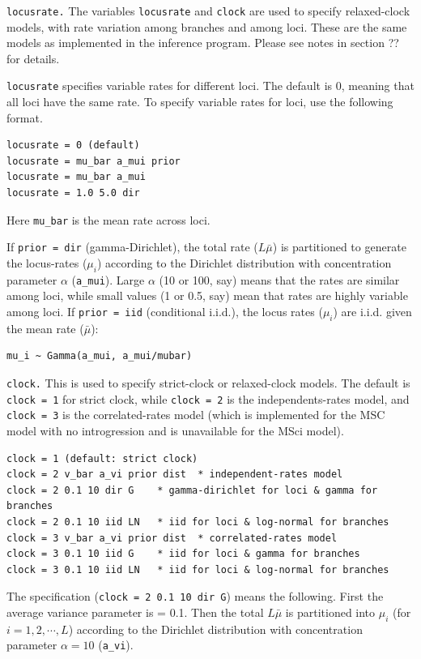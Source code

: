 \documentclass[a4paper]{book}
\numberwithin{equation}{section} \renewcommand{\baselinestretch}{0.55}
\begin{document}
\texttt{locusrate.}  The variables \texttt{locusrate} and
\texttt{clock} are used to specify relaxed-clock models, with rate
variation among branches and among loci.  These are the same models as
implemented in the inference program.  Please see notes in section ??
for details.

\texttt{locusrate} specifies variable rates for different loci.  The
default is 0, meaning that all loci have the same rate.  To specify
variable rates for loci, use the following format.
\begin{verbatim}
locusrate = 0 (default)
locusrate = mu_bar a_mui prior
locusrate = mu_bar a_mui
locusrate = 1.0 5.0 dir
\end{verbatim}
Here \texttt{mu\_bar} is the mean rate across loci.

If \texttt{prior = dir} (gamma-Dirichlet), the total rate ($L\bar\mu$)
is partitioned to generate the locus-rates ($\mu_i$) according to the
Dirichlet distribution with concentration parameter $\alpha$
(\texttt{a\_mui}).  Large $\alpha$ (10 or 100, say) means that the
rates are similar among loci, while small values (1 or 0.5, say) mean
that rates are highly variable among loci. If \texttt{prior = iid}
(conditional i.i.d.), the locus rates ($\mu_i$) are i.i.d. given the
mean rate ($\bar\mu$):
\begin{verbatim}
mu_i ~ Gamma(a_mui, a_mui/mubar)
\end{verbatim}

\texttt{clock.}  This is used to specify strict-clock or relaxed-clock
models.  The default is \texttt{clock = 1} for strict clock, while
\texttt{clock = 2} is the independents-rates model, and \texttt{clock
  = 3} is the correlated-rates model (which is implemented for the MSC
model with no introgression and is unavailable for the MSci model).
\begin{verbatim}
clock = 1 (default: strict clock)
clock = 2 v_bar a_vi prior dist  * independent-rates model
clock = 2 0.1 10 dir G    * gamma-dirichlet for loci & gamma for branches
clock = 2 0.1 10 iid LN   * iid for loci & log-normal for branches
clock = 3 v_bar a_vi prior dist  * correlated-rates model
clock = 3 0.1 10 iid G    * iid for loci & gamma for branches
clock = 3 0.1 10 iid LN   * iid for loci & log-normal for branches
\end{verbatim}
The specification (\texttt{clock = 2 0.1 10 dir G}) means the
following.  First the average variance parameter is = 0.1.  Then the
total $L\bar\mu$ is partitioned into $\mu_i$ (for
$i = 1, 2, \cdots, L$) according to the Dirichlet distribution with
concentration parameter $\alpha = 10$ (\texttt{a\_vi}).
\end{document}
